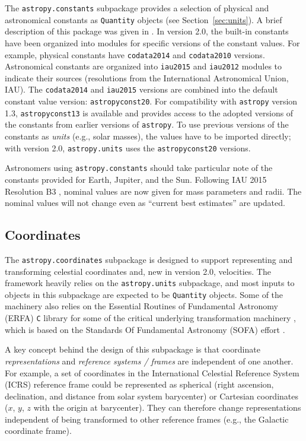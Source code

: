 \documentclass[modern]{aastex61}
\newcommand{\package}[1]{\texttt{#1}\xspace}
\newcommand{\astropypkg}{\package{astropy}}
\newcommand{\sectionname}{Section\xspace}
\begin{document}
The \texttt{astropy.constants} subpackage provides a selection of physical and
astronomical constants as \texttt{Quantity} objects (see
\sectionname~\ref{sec:units}).
A brief description of this package was given in \cite{astropy}.
In version 2.0, the built-in constants have been organized into modules for
specific versions of the constant values.
For example, physical constants have \texttt{codata2014} \citep{codata2014} and
\texttt{codata2010} versions.
Astronomical constants are organized into \texttt{iau2015} and \texttt{iau2012}
modules to indicate their sources (resolutions from the International
Astronomical Union, IAU).
The \texttt{codata2014} and \texttt{iau2015} versions are combined into the
default constant value version: \texttt{astropyconst20}.
For compatibility with \astropypkg version 1.3,  \texttt{astropyconst13}
is available and provides access to the adopted versions of the
constants from earlier versions of \astropypkg.
To use previous versions of the constants as \emph{units} (e.g., solar masses),
the values have to be imported directly; with version
2.0, \texttt{astropy.units} uses the \texttt{astropyconst20} versions.

Astronomers using \texttt{astropy.constants} should take particular note of the
constants provided for Earth, Jupiter, and the Sun.
Following IAU 2015 Resolution B3 \citep{iau2015b3}, nominal values are now given
for mass parameters and radii.
The nominal values will not change even as ``current best estimates'' are
updated.

\subsection{Coordinates}
\label{sec:coordinates}
The \package{astropy.coordinates} subpackage is designed to support representing
and transforming celestial coordinates and, new in version 2.0, velocities.
The framework heavily relies on the \package{astropy.units} subpackage, and most
inputs to objects in this subpackage are expected to be \texttt{Quantity}
objects.
Some of the machinery also relies on the Essential Routines of Fundamental
Astronomy (ERFA) \texttt{C} library for some of the critical underlying
transformation machinery \citep{erfa}, which is based on the Standards Of
Fundamental Astronomy (SOFA) effort \citep{sofa}.

A key concept behind the design of this subpackage is that coordinate
\textit{representations} and \textit{reference systems / frames} are independent
of one another.
For example, a set of coordinates in the International Celestial Reference
System (ICRS) reference frame could be represented as spherical (right
ascension, declination, and distance from solar system barycenter) or Cartesian
coordinates ($x$, $y$, $z$ with the origin at barycenter).
They can therefore change representations independent of being transformed to
other reference frames (e.g., the Galactic coordinate frame).
\end{document}
